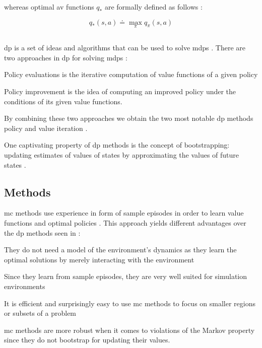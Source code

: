 \documentclass[draft=false]{seal_thesis}
\begin{document}
whereas optimal \gls{av} functions $q_*$ are formally defined as follows \citep[p. 74]{Sutton2017}:

\begin{equation}
	q_* (s,a) \doteq \max_\pi q_\pi (s,a)
\end{equation}

\subsection{}
\label{subsec:dp}

\gls{dp} is a set of ideas and algorithms that can be used to solve \glspl{mdp} \citep[p. 95]{Sutton2017}. There are two approaches in \gls{dp} for solving \glspl{mdp} \citep[p. 95]{Sutton2017}:
\begin{enumerate*}
	\item Policy evaluations is the iterative computation of value functions of a given policy
	\item Policy improvement is the idea of computing an improved policy under the conditions of its given value functions.
\end{enumerate*}

By combining these two approaches we obtain the two most notable \gls{dp} methods \ie policy and value iteration \citep[p. 95]{Sutton2017}.

One captivating property of \gls{dp} methods is the concept of bootstrapping: updating estimates of values of states by approximating the values of future states \citep[p. 96]{Sutton2017}.

\subsection{ Methods}
\label{subsec:mc}

\gls{mc} methods use experience in form of sample episodes in order to learn value functions and optimal policies \citep[p. 123]{Sutton2017}. This approach yields different advantages over the \gls{dp} methods seen in  \citep[p. 123]{Sutton2017}:
\begin{enumerate*}
	\item They do not need a model of the environment's dynamics as they learn the optimal solutions by merely interacting with the environment
	\item Since they learn from sample episodes, they are very well suited for simulation environments
	\item It is efficient and surprisingly easy to use \gls{mc} methods to focus on smaller regions or subsets of a problem
	\item \gls{mc} methods are more robust when it comes to violations of the Markov property since they do not bootstrap for updating their values.
\end{enumerate*}
\end{document}
